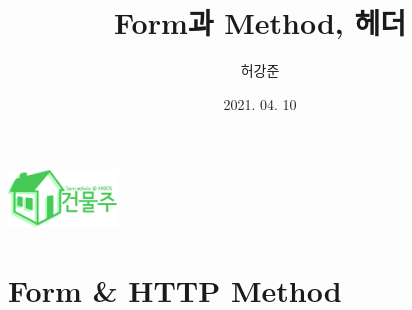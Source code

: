 \documentclass{beamer}
\title{Form과 Method, 헤더}
\author{허강준}
\institute{충남대학교 정보보호동아리 ARGOS}
\date{2021. 04. 10}
\begin{document}
\begin{frame}
    \begin{center}
        \includegraphics[height=1.5cm]{../Images/logo.png}
    \end{center}

    \maketitle
\end{frame}

\section{Form \& HTTP Method}
\end{document}
